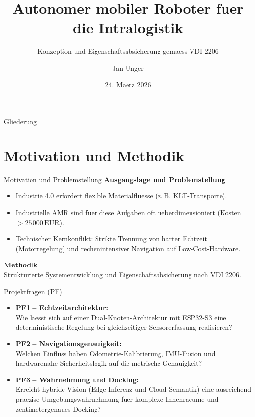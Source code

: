 \documentclass[aspectratio=169]{beamer}
\title{Autonomer mobiler Roboter fuer die Intralogistik}
\subtitle{Konzeption und Eigenschaftsabsicherung gemaess VDI 2206}
\author{Jan Unger}
\date{24. Maerz 2026}
\begin{document}

\maketitle

\begin{frame}{Gliederung}
  \small
  \tableofcontents
\end{frame}

\section{Motivation und Methodik}

\begin{frame}{Motivation und Problemstellung}
  \textbf{Ausgangslage und Problemstellung}
  \begin{itemize}
    \item Industrie 4.0 erfordert flexible Materialfluesse (z.\,B. KLT-Transporte).
    \item Industrielle AMR sind fuer diese Aufgaben oft ueberdimensioniert (Kosten $> 25\,000\,\mathrm{EUR}$).
    \item Technischer Kernkonflikt: Strikte Trennung von harter Echtzeit (Motorregelung) und rechenintensiver Navigation auf Low-Cost-Hardware.
  \end{itemize}

  \vspace{1em}
  \textbf{Methodik}\\
  Strukturierte Systementwicklung und Eigenschaftsabsicherung nach VDI 2206.
\end{frame}

\begin{frame}{Projektfragen (PF)}
  \begin{itemize}
    \item \textbf{PF1 -- Echtzeitarchitektur:}\\ Wie laesst sich auf einer Dual-Knoten-Architektur mit ESP32-S3 eine deterministische Regelung bei gleichzeitiger Sensorerfassung realisieren?
    \item \textbf{PF2 -- Navigationsgenauigkeit:}\\ Welchen Einfluss haben Odometrie-Kalibrierung, IMU-Fusion und hardwarenahe Sicherheitslogik auf die metrische Genauigkeit?
    \item \textbf{PF3 -- Wahrnehmung und Docking:}\\ Erreicht hybride Vision (Edge-Inferenz und Cloud-Semantik) eine ausreichend praezise Umgebungswahrnehmung fuer komplexe Innenraeume und zentimetergenaues Docking?
  \end{itemize}
\end{frame}
\end{document}
